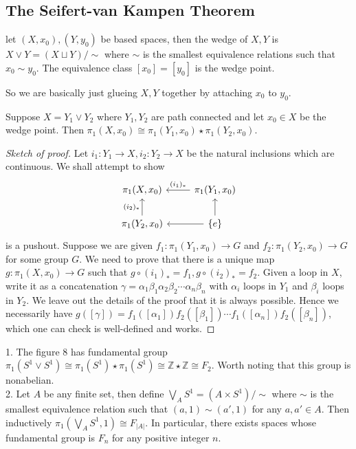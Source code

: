 \subsection{The Seifert-van Kampen Theorem}
\begin{definition}
    let $(X,x_0),(Y,y_0)$ be based spaces, then the wedge of $X,Y$ is $X\vee Y=(X\sqcup Y)/\sim$ where $\sim$ is the smallest equivalence relations such that $x_0\sim y_0$.
    The equivalence class $[x_0]=[y_0]$ is the wedge point.
\end{definition}
So we are basically just glueing $X,Y$ together by attaching $x_0$ to $y_0$.
\begin{theorem}\label{s-vk_wedge}
    Suppose $X=Y_1\vee Y_2$ where $Y_1,Y_2$ are path connected and let $x_0\in X$ be the wedge point.
    Then $\pi_1(X,x_0)\cong\pi_1(Y_1,x_0)\star\pi_1(Y_2,x_0)$.
\end{theorem}
\begin{proof}[Sketch of proof]
    Let $i_1:Y_1\to X,i_2:Y_2\to X$ be the natural inclusions which are continuous.
    We shall attempt to show
    \[
        \begin{tikzcd}
            \pi_1(X,x_0)&\pi_1(Y_1,x_0)\arrow[swap]{l}{(i_1)_\ast}\\
            \pi_1(Y_2,x_0)\arrow{u}{(i_2)_\ast}&\{e\}\arrow{u}\arrow{l}
        \end{tikzcd}
    \]
    is a pushout.
    Suppose we are given $f_1:\pi_1(Y_1,x_0)\to G$ and $f_2:\pi_1(Y_2,x_0)\to G$ for some group $G$.
    We need to prove that there is a unique map $g:\pi_1(X,x_0)\to G$ such that $g\circ (i_1)_\ast=f_1,g\circ (i_2)_\ast=f_2$.
    Given a loop in $X$, write it as a concatenation $\gamma=\alpha_1\beta_1\alpha_2\beta_2\cdots\alpha_n\beta_n$ with $\alpha_i$ loops in $Y_1$ and $\beta_i$ loops in $Y_2$.
    We leave out the details of the proof that it is always possible.
    Hence we necessarily have $g([\gamma])=f_1([\alpha_1])f_2([\beta_1])\cdots f_1([\alpha_n])f_2([\beta_n])$, which one can check is well-defined and works.
\end{proof}
\begin{example}
    1. The figure 8 has fundamental group $\pi_1(S^1\vee S^1)\cong\pi_1(S^1)\star\pi_1(S^1)\cong\mathbb Z\star\mathbb Z\cong F_2$.
    Worth noting that this group is nonabelian.\\
    2. Let $A$ be any finite set, then define $\bigvee_AS^1=(A\times S^1)/\sim$ where $\sim$ is the smallest equivalence relation such that $(a,1)\sim (a',1)$ for any $a,a'\in A$.
    Then inductively $\pi_1(\bigvee_AS^1,1)\cong F_{|A|}$.
    In particular, there exists spaces whose fundamental group is $F_n$ for any positive integer $n$.
\end{example}
